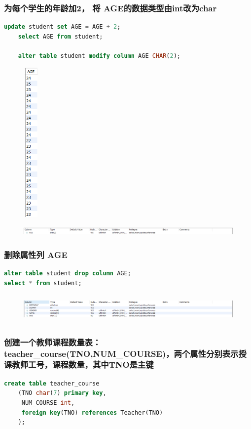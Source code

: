 \documentclass{ctexart}
\begin{document}
\subsubsection{为每个学生的年龄加2， 将 AGE的数据类型由int改为char}
\begin{lstlisting}[language=sql]
	update student set AGE = AGE + 2;  
	select AGE from student;  
	  
	alter table student modify column AGE CHAR(2);
\end{lstlisting}
\begin{figure}[H]
	\centering 
	\includegraphics[height=8cm,width=0.8cm]{8.png}
	\end{figure}
	\begin{figure}[H]
		\centering 
		\includegraphics[height=0.5cm,width=14cm]{9.png}
		\end{figure}
\subsubsection{删除属性列 AGE}
\begin{lstlisting}[language=sql]
alter table student drop column AGE;  
select * from student;
\end{lstlisting}
\begin{figure}[H]
	\centering 
	\includegraphics[height=1.5cm,width=16cm]{10.png}
	\end{figure}
\subsubsection{创建一个教师课程数量表：teacher\_course(TNO,NUM\_COURSE)，两个属性分别表示授课教师工号，课程数量，其中TNO是主键}
\begin{lstlisting}[language=sql]
	create table teacher_course  
	(TNO char(7) primary key,  
     NUM_COURSE int,  
     foreign key(TNO) references Teacher(TNO)  
    );  
\end{lstlisting}
\end{document}
